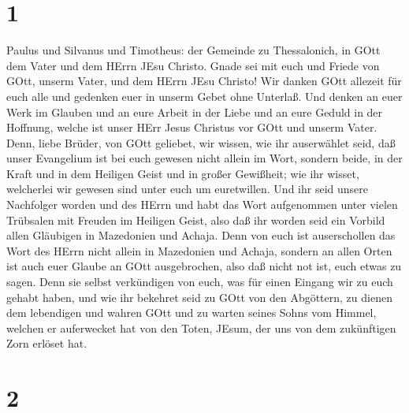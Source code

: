\hypertarget{section}{%
\section{1}\label{section}}

 Paulus und Silvanus und Timotheus: der Gemeinde zu
Thessalonich, in GOtt dem Vater und dem HErrn JEsu Christo. Gnade sei
mit euch und Friede von GOtt, unserm Vater, und dem HErrn JEsu Christo!
 Wir danken GOtt allezeit für euch alle und gedenken euer in
unserm Gebet ohne Unterlaß.  Und denken an euer Werk im
Glauben und an eure Arbeit in der Liebe und an eure Geduld in der
Hoffnung, welche ist unser HErr Jesus Christus vor GOtt und unserm
Vater.  Denn, liebe Brüder, von GOtt geliebet, wir wissen,
wie ihr auserwählet seid,  daß unser Evangelium ist bei euch
gewesen nicht allein im Wort, sondern beide, in der Kraft und in dem
Heiligen Geist und in großer Gewißheit; wie ihr wisset, welcherlei wir
gewesen sind unter euch um euretwillen.  Und ihr seid unsere
Nachfolger worden und des HErrn und habt das Wort aufgenommen unter
vielen Trübsalen mit Freuden im Heiligen Geist,  also daß
ihr worden seid ein Vorbild allen Gläubigen in Mazedonien und Achaja.
 Denn von euch ist auserschollen das Wort des HErrn nicht
allein in Mazedonien und Achaja, sondern an allen Orten ist auch euer
Glaube an GOtt ausgebrochen, also daß nicht not ist, euch etwas zu
sagen.  Denn sie selbst verkündigen von euch, was für einen
Eingang wir zu euch gehabt haben, und wie ihr bekehret seid zu GOtt von
den Abgöttern, zu dienen dem lebendigen und wahren GOtt 
und zu warten seines Sohns vom Himmel, welchen er auferwecket hat von
den Toten, JEsum, der uns von dem zukünftigen Zorn erlöset hat.

\hypertarget{section-1}{%
\section{2}\label{section-1}}

